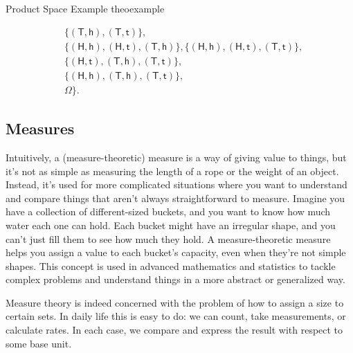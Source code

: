 \documentclass{tufte-handout}
\begin{document}
\begin{mybox}{Product Space Example  }{theoexample}
\begin{itemize}
\begin{align*}
                                   & \{( \mathsf T,\mathsf   h), ( \mathsf T, \mathsf   t)\}, \\                                    
                                   & \{(\mathsf H, \mathsf h), (\mathsf  H, \mathsf  t), ( \mathsf T,\mathsf h)\},
                                       \{(\mathsf H,\mathsf h), (\mathsf H,\mathsf t), (\mathsf T, \mathsf  t)\},\\  
                                   & \{( \mathsf H,\mathsf  t), (\mathsf T, \mathsf h), ( \mathsf T,\mathsf    t)\},\\ 
                                   & \{( \mathsf H,\mathsf  h), (\mathsf T,\mathsf h), ( \mathsf T,\mathsf   t)\},\\ 
                                   & \Omega\}.                                                                                                                                                             
\end{align*} 
\end{itemize}  
\end{mybox}

\subsection{Measures }


Intuitively, a (measure-theoretic) measure is a way of giving value to things, but it's not as simple as measuring the length of a rope or the weight of an object. Instead, it's used for more complicated situations where you want to understand and compare things that aren't always straightforward to measure.
Imagine you have a collection of different-sized buckets, and you want to know how much water each one can hold. Each bucket might have an irregular shape, and you can't just fill them to see how much they hold. A measure-theoretic measure helps you assign a value to each bucket's capacity, even when they're not simple shapes. This concept is used in advanced mathematics and statistics to tackle complex problems and understand things in a more abstract or generalized way.


Measure theory is indeed concerned with the problem of how to assign a size to certain sets. 
In daily life this is easy to do: we can count, take measurements, or calculate rates. In each case, we compare
and express the result with respect to some base unit. 
\end{document}
